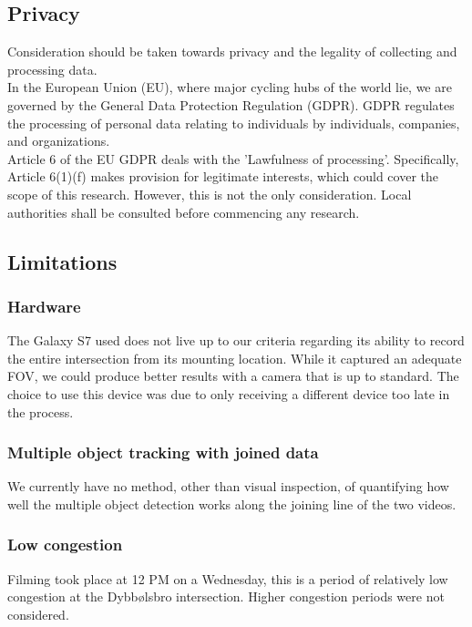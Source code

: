 \subsection{Privacy}

Consideration should be taken towards privacy and the legality of collecting and processing data.
\ \\

In the European Union (EU), where major cycling hubs of the world lie, we are governed by the General Data Protection Regulation (GDPR). GDPR regulates the processing of personal data 
relating to individuals by individuals, companies, and organizations.
\ \\

Article 6 of the EU GDPR deals with the 'Lawfulness of processing'. Specifically, Article 6(1)(f)
makes provision for legitimate interests, which could cover the scope of this research.
However, this is not the only consideration. Local authorities shall be consulted before commencing any research.
\ \\

\subsection{Limitations}
\subsubsection{Hardware}
The Galaxy S7 used does not live up to our criteria regarding its 
ability to record the entire intersection from its mounting location. While it captured an adequate 
FOV, we could produce better results with a camera that is up to standard. The choice to use this device 
was due to only receiving a different device too late in the process.
\ \\

\subsubsection{Multiple object tracking with joined data}
We currently have no method, other than visual inspection, of quantifying how well the multiple object 
detection works along the joining line of the two videos.
\ \\

\subsubsection{Low congestion}
Filming took place at 12 PM on a Wednesday, this is a period of relatively low congestion at the Dybbølsbro intersection. 
Higher congestion periods were not considered.
\ \\

